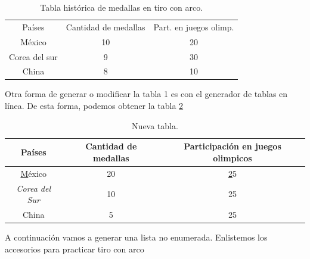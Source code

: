 \documentclass[12pt, legalpaper]{article}
\begin{document}
\begin{table}[H]
    \centering
    \begin{tabular}{c|c|c}
      Países   &  Cantidad de medallas & Part. en juegos olimp.\\
      México   &            10         & 20\\
      Corea del sur &       9          &  30\\
      China         &       8          & 10
    \end{tabular}
    \caption{Tabla histórica de medallas en tiro con arco.}
    \label{tab1}
\end{table}

Otra forma de generar o modificar la tabla 1 es con el generador de tablas en línea. De esta forma, podemos obtener la tabla \ref{tab2}


\begin{table}[H]
\begin{tabular}{|c|c|c|}
\hline
\rowcolor[HTML]{67FD9A} 
{\color[HTML]{333333} \textbf{Países}} & {\color[HTML]{333333} \textbf{Cantidad de medallas}} & {\color[HTML]{333333} \textbf{Participación en juegos olimpicos}} \\ \hline
\rowcolor[HTML]{FFFFFF} 
{\color[HTML]{333333} {\ul México}}           & {\color[HTML]{333333} 20} & {\color[HTML]{333333} {\ul 25}} \\ \hline
\rowcolor[HTML]{FFFFFF} 
{\color[HTML]{333333} \textit{Corea del Sur}} & {\color[HTML]{333333} 10} & {\color[HTML]{333333} 25}       \\ \hline
\rowcolor[HTML]{FFFFFF} 
China                                         & 5                         & 25                              \\ \hline
\end{tabular}
\caption{Nueva tabla.}
\label{tab2}
\end{table}



A continuación vamos a generar una lista no enumerada. Enlistemos los accesorios para practicar tiro con arco
\end{document}
